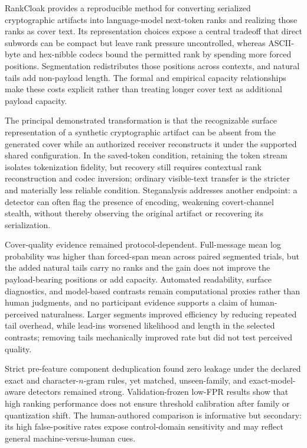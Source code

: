 \documentclass[fleqn,10pt]{wlscirep}
\begin{document}
RankCloak provides a reproducible method for converting serialized cryptographic artifacts into language-model next-token ranks and realizing those ranks as cover text. Its representation choices expose a central tradeoff that direct subwords can be compact but leave rank pressure uncontrolled, whereas ASCII-byte and hex-nibble codecs bound the permitted rank by spending more forced positions. Segmentation redistributes those positions across contexts, and natural tails add non-payload length. The formal and empirical capacity relationships make these costs explicit rather than treating longer cover text as additional payload capacity.

The principal demonstrated transformation is that the recognizable surface representation of a synthetic cryptographic artifact can be absent from the generated cover while an authorized receiver reconstructs it under the supported shared configuration. In the saved-token condition, retaining the token stream isolates tokenization fidelity, but recovery still requires contextual rank reconstruction and codec inversion; ordinary visible-text transfer is the stricter and materially less reliable condition. Steganalysis addresses another endpoint: a detector can often flag the presence of encoding, weakening covert-channel stealth, without thereby observing the original artifact or recovering its serialization.

Cover-quality evidence remained protocol-dependent. Full-message mean log probability was higher than forced-span mean across paired segmented trials, but the added natural tails carry no ranks and the gain does not improve the payload-bearing positions or add capacity. Automated readability, surface diagnostics, and model-based contrasts remain computational proxies rather than human judgments, and no participant evidence supports a claim of human-perceived naturalness. Larger segments improved efficiency by reducing repeated tail overhead, while lead-ins worsened likelihood and length in the selected contrasts; removing tails mechanically improved rate but did not test perceived quality.

Strict pre-feature component deduplication found zero leakage under the declared exact and character-\(n\)-gram rules, yet matched, unseen-family, and exact-model-aware detectors remained strong. Validation-frozen low-FPR results show that high ranking performance does not ensure threshold calibration after family or quantization shift. The human-authored comparison is informative but secondary: its high false-positive rates expose control-domain sensitivity and may reflect general machine-versus-human cues.
\end{document}
